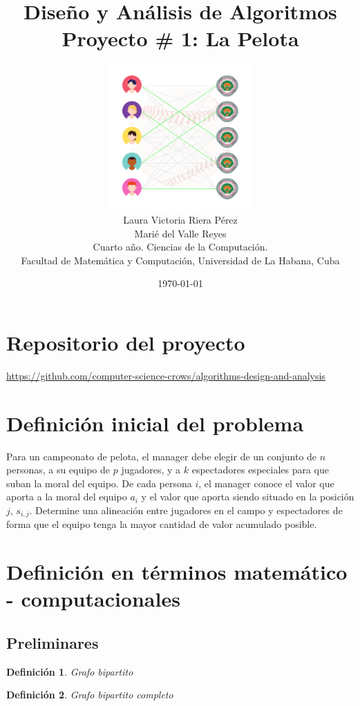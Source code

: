 \documentclass[10pt]{article} %
\title{\normalsize{Dise\~no y An\'alisis de Algoritmos }\\
	\Huge\bfseries Proyecto \# 1: La Pelota \\
} %
\author{%
	\includegraphics[width=15em]{logo.png}\\
	Laura Victoria Riera P\'erez\\
	Mari\'e del Valle Reyes \vspace{1em} \\
	\small Cuarto a\~no. Ciencias de la Computaci\'on. \\ %
	\small Facultad de Matem\'atica y Computaci\'on, Universidad de La Habana, Cuba \\ %
}
\date{\footnotesize \today } %
\newtheorem{mydef}{Definici\'on}%
\begin{document}
	\maketitle
	
	
	\section{Repositorio del proyecto}
	
	\begin{center}
		\href{https://github.com/computer-science-crows/algorithms-design-and-analysis}{https://github.com/computer-science-crows/algorithms-design-and-analysis}
	\end{center}

	\section{Definici\'on inicial del problema} 
	
	Para un campeonato de pelota, el manager debe elegir de un conjunto de $ n $ personas, a su equipo de $ p $ jugadores, y a $ k $ espectadores especiales para que suban la moral del equipo.
	De cada persona $ i $, el manager conoce el valor que aporta a la moral del equipo $ a_i $ y el valor que aporta siendo situado en la posici\'on $ j $, $ s_{i,j} $. 
	Determine una alineación entre jugadores en el campo y espectadores de forma que el equipo tenga la mayor cantidad de valor acumulado posible.
	
	\section{Definici\'on en t\'erminos matem\'atico - computacionales}
	
	\subsection{Preliminares}
	
	\begin{mydef}
		Grafo bipartito
	\end{mydef}
	
	\begin{mydef}
		Grafo bipartito completo
	\end{mydef}
	
\end{document}
